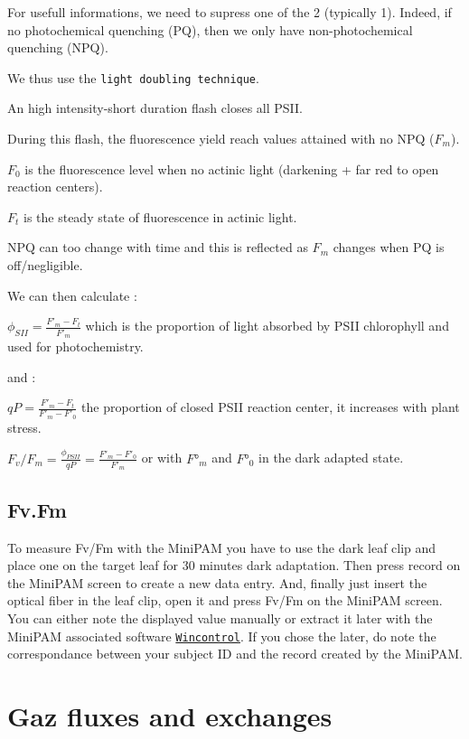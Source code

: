 \documentclass[
  12pt,
  american,
  a4paper,
  extrafontsizes,onecolumn,openright
  ]{memoir}
\begin{document}
For usefull informations, we need to supress one of the 2 (typically 1).
Indeed, if no photochemical quenching (PQ), then we only have non-photochemical quenching (NPQ).

We thus use the \texttt{light\ doubling\ technique}.

An high intensity-short duration flash closes all PSII.

During this flash, the fluorescence yield reach values attained with no NPQ (\(F_m\)).

\(F_0\) is the fluorescence level when no actinic light (darkening + far red to open reaction centers).

\(F_t\) is the steady state of fluorescence in actinic light.

NPQ can too change with time and this is reflected as \(F_m\) changes when PQ is off/negligible.

We can then calculate :

\(\phi _{SII} = \frac{F'_m-F_t}{F'_m}\) which is the proportion of light absorbed by PSII chlorophyll and used for photochemistry.

and :

\(qP = \frac{F'_m-F_t}{F'_m-F'_0}\) the proportion of closed PSII reaction center, it increases with plant stress.

\(F_v/F_m=\frac{\phi _{PSII}}{qP}=\frac{F'_m-F'_0}{F'_m}\) or with \(F°_m\) and \(F°_0\) in the dark adapted state.

\hypertarget{fv.fm}{%
\section{Fv.Fm}\label{fv.fm}}

To measure Fv/Fm with the MiniPAM you have to use the dark leaf clip and place one on the target leaf for 30 minutes dark adaptation.
Then press record on the MiniPAM screen to create a new data entry.
And, finally just insert the optical fiber in the leaf clip, open it and press Fv/Fm on the MiniPAM screen.
You can either note the displayed value manually or extract it later with the MiniPAM associated software \href{https://www.walz.com/products/chl_p700/mini-pam-II/downloads.html}{\texttt{Wincontrol}}.
If you chose the later, do note the correspondance between your subject ID and the record created by the MiniPAM.

\hypertarget{gaz-fluxes-and-exchanges}{%
\chapter{Gaz fluxes and exchanges}\label{gaz-fluxes-and-exchanges}}
\end{document}
